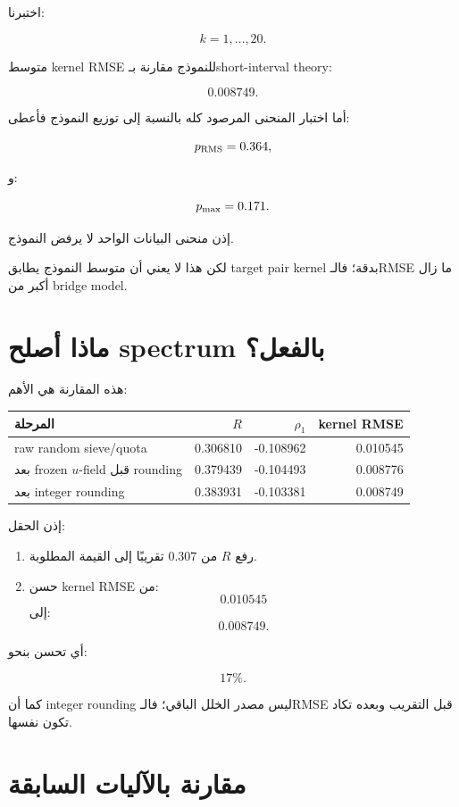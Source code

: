 \documentclass[12pt]{article}
\begin{document}
اختبرنا:

\[
k=1,\ldots,20.
\]

متوسط kernel RMSE للنموذج مقارنة بـshort-interval theory:

\[
\boxed{
0.008749.
}
\]

أما اختبار المنحنى المرصود كله بالنسبة إلى توزيع النموذج فأعطى:

\[
p_{\rm RMS}
=
0.364,
\]

و:

\[
p_{\rm max}
=
0.171.
\]

إذن منحنى البيانات الواحد لا يرفض النموذج.

لكن هذا لا يعني أن متوسط النموذج يطابق target pair kernel بدقة؛
فالـRMSE ما زال أكبر من bridge model.

\section{ماذا أصلح spectrum بالفعل؟}

هذه المقارنة هي الأهم:

\begin{center}
\begin{tabular}{lrrr}
\toprule
المرحلة & \(R\) & \(\rho_1\) & kernel RMSE\\
\midrule
raw random sieve/quota
& 0.306810
& -0.108962
& 0.010545\\
بعد frozen \(u\)-field قبل rounding
& 0.379439
& -0.104493
& 0.008776\\
بعد integer rounding
& 0.383931
& -0.103381
& 0.008749\\
\bottomrule
\end{tabular}
\end{center}

إذن الحقل:

\begin{enumerate}
\item رفع \(R\) من \(0.307\) تقريبًا إلى القيمة المطلوبة.
\item حسن kernel RMSE من:
\[
0.010545
\]
إلى:
\[
0.008749.
\]
\end{enumerate}

أي تحسن بنحو:

\[
\boxed{17\%}.
\]

كما أن integer rounding ليس مصدر الخلل الباقي؛ فالـRMSE قبل التقريب وبعده
تكاد تكون نفسها.

\section{مقارنة بالآليات السابقة}
\end{document}
